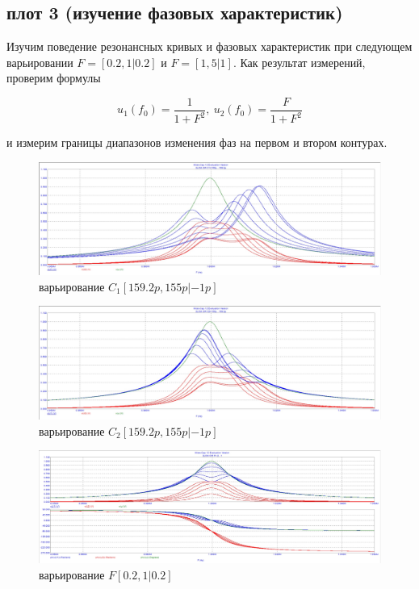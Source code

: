 \documentclass[a4paper, 14pt]{extarticle}%
\begin{document}
\newpage

\subsection{плот 3 (изучение фазовых характеристик)}

Изучим поведение резонансных кривых и фазовых характеристик при следующем варьировании $F = [0.2, 1|0.2]$ и $F = [1, 5|1]$. Как результат измерений, проверим формулы

\[ u_1(f_0) = \frac{1}{1+F^2},\ u_2(f_0) = \frac{F}{1 + F^2} \]

и измерим границы диапазонов изменения фаз на первом и втором контурах.

\begin{figure}[h!]
	\centering
			\includegraphics[width=1.1\linewidth]{1.2_varC1_3.jpg}
            \caption{варьирование $C_1 [159.2p,155p|-1p]$}
	\label{A}
\end{figure}

\begin{figure}[h!]
	\centering
			\includegraphics[width=1.1\linewidth]{1.2_varC1_4.jpg}
            \caption{варьирование $C_2 [159.2p,155p|-1p]$}
	\label{A}
\end{figure}

\begin{figure}[h!]
	\centering
			\includegraphics[width=1.1\linewidth]{1.2varF1.jpg}
            \caption{варьирование $F [0.2, 1|0.2]$}
	\label{A}
\end{figure}
\end{document}
